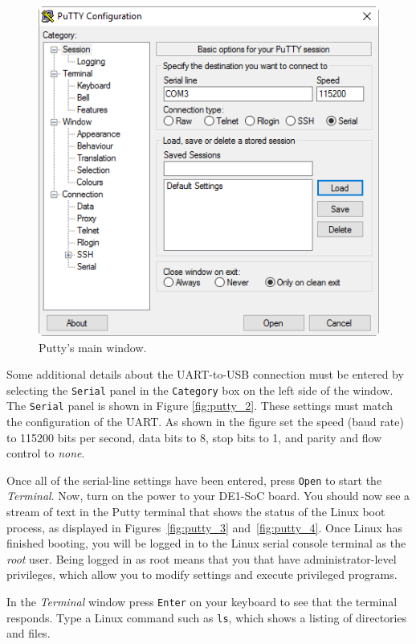 \documentclass[11pt, twoside, pdftex]{article}
\begin{document}
\begin{figure}[H]
   \begin{center}
       \includegraphics[scale=0.7]{figures/fig_putty_tut_1}
   \end{center}
   \caption{Putty's main window.}
	\label{fig:putty_1}
\end{figure}

Some additional details about the UART-to-USB connection must be entered by selecting the 
\texttt{Serial} panel in the \texttt{Category} box on the left side of the window. The
\texttt{Serial}
panel is shown in Figure \ref{fig:putty_2}. These settings must match the configuration of the 
UART. As shown in the figure set the speed (baud rate) to 115200 bits per second, data
bits to 8, stop bits to 1, and parity and flow control to \textit{none}. 

Once all of the serial-line settings have been entered, press \texttt{Open} to start the
{\it Terminal}. Now, turn on the power to your DE1-SoC board. You should now see a stream 
of text in the Putty terminal that shows the status of the Linux boot process, as displayed in 
Figures~\ref{fig:putty_3} and~\ref{fig:putty_4}. Once Linux has finished booting, you will be 
logged in to the Linux serial console terminal as the \textit{root} user. Being logged 
in as root means that you that have administrator-level privileges, which allow you to modify 
settings and execute privileged programs.

In the {\it Terminal} window press \texttt{Enter} on your keyboard to see that the
terminal responds.  Type a Linux command such as \texttt{ls}, which shows a listing of 
directories and files. 
\end{document}
